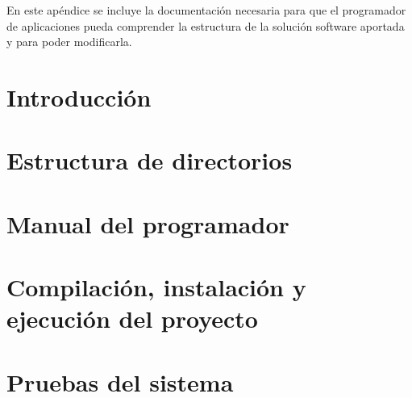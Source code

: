 
En este apéndice se incluye la documentación necesaria para que el programador de aplicaciones pueda comprender la estructura de la solución software aportada y para poder modificarla.


\section{Introducción}

\section{Estructura de directorios}

\section{Manual del programador}

\section{Compilación, instalación y ejecución del proyecto}

\section{Pruebas del sistema}
